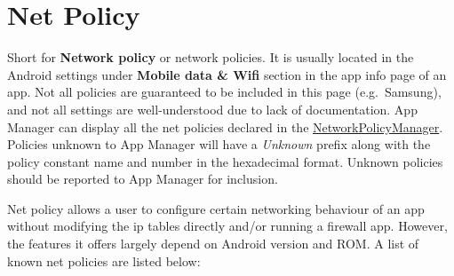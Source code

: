 \section{Net Policy}\label{sec:net-policy} %
Short for \textbf{Network policy} or network policies.
It is usually located in the Android settings under \textbf{Mobile data \& Wifi} section in the app info page of an app.
Not all policies are guaranteed to be included in this page (e.g.\ Samsung), and not all settings are well-understood due to lack of documentation.
App Manager can display all the net policies declared in the \href{https://android.googlesource.com/platform/frameworks/base/+/master/core/java/android/net/NetworkPolicyManager.java}{NetworkPolicyManager}.
Policies unknown to App Manager will have a \textit{Unknown} prefix along with the policy constant name and number in the hexadecimal format.
Unknown policies should be reported to App Manager for inclusion.

Net policy allows a user to configure certain networking behaviour of an app without modifying the ip tables directly and/or running a firewall app.
However, the features it offers largely depend on Android version and ROM. A list of known net policies are listed below:

